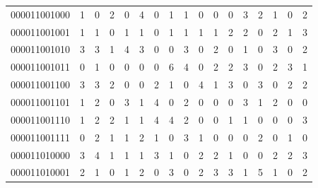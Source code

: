 \documentclass[10pt,a4paper]{article}
\begin{document}
\begin{longtable}{ |c|c|c|c|c|c|c|c|c|c|c|c|c|c|c|c|c| }
    000011001000              & 1                            & 0                                & 2                            & 0                              & 4   & 0   & 1   & 1   & 0   & 0   & 0   & 3   & 2   & 1   & 0   & 2   \\
    000011001001              & 1                            & 1                                & 0                            & 1                              & 1   & 0   & 1   & 1   & 1   & 1   & 2   & 2   & 0   & 2   & 1   & 3   \\
    000011001010              & 3                            & 3                                & 1                            & 4                              & 3   & 0   & 0   & 3   & 0   & 2   & 0   & 1   & 0   & 3   & 0   & 2   \\
    000011001011              & 0                            & 1                                & 0                            & 0                              & 0   & 0   & 6   & 4   & 0   & 2   & 2   & 3   & 0   & 2   & 3   & 1   \\
    000011001100              & 3                            & 3                                & 2                            & 0                              & 0   & 2   & 1   & 0   & 4   & 1   & 3   & 0   & 3   & 0   & 2   & 2   \\
    000011001101              & 1                            & 2                                & 0                            & 3                              & 1   & 4   & 0   & 2   & 0   & 0   & 0   & 3   & 1   & 2   & 0   & 0   \\
    000011001110              & 1                            & 2                                & 2                            & 1                              & 1   & 4   & 4   & 2   & 0   & 0   & 1   & 1   & 0   & 0   & 0   & 3   \\
    000011001111              & 0                            & 2                                & 1                            & 1                              & 2   & 1   & 0   & 3   & 1   & 0   & 0   & 0   & 2   & 0   & 1   & 0   \\
    000011010000              & 3                            & 4                                & 1                            & 1                              & 1   & 3   & 1   & 0   & 2   & 2   & 1   & 0   & 0   & 2   & 2   & 3   \\
    000011010001              & 2                            & 1                                & 0                            & 1                              & 2   & 0   & 3   & 0   & 2   & 3   & 3   & 1   & 5   & 1   & 0   & 2   \\

\end{longtable}
\end{document}
